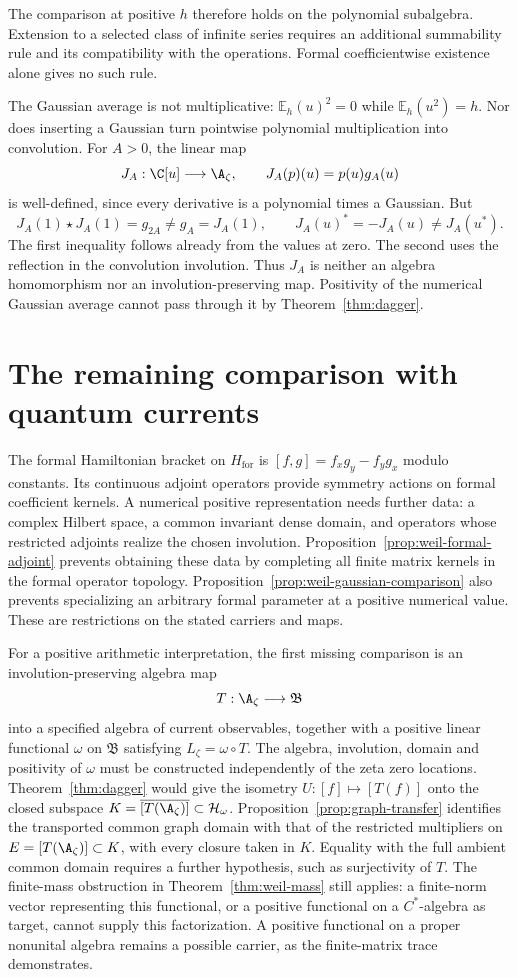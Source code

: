 The comparison at positive $h$ therefore holds on the polynomial
subalgebra.  Extension to a selected class of infinite series requires
an additional summability rule and its compatibility with the operations.
Formal coefficientwise existence alone gives no such rule.

The Gaussian average is not multiplicative:
$\mathbb E_h(u)^2=0$ while $\mathbb E_h(u^2)=h$.
Nor does inserting a Gaussian turn pointwise polynomial multiplication
into convolution.  For $A>0$, the linear map
\[
 J_A:\C[u]\longrightarrow\A_\zeta,\qquad J_A(p)(u)=p(u)g_A(u)
\]
is well-defined, since every derivative is a polynomial times a Gaussian.
But
\[
 J_A(1)\star J_A(1)=g_{2A}\ne g_A=J_A(1),
 \qquad J_A(u)^*=-J_A(u)\ne J_A(u^*).
\]
The first inequality follows already from the values at zero.
The second uses the reflection in the convolution involution.
Thus $J_A$ is neither an algebra homomorphism nor an involution-preserving
map.  Positivity of the numerical Gaussian average cannot pass through
it by Theorem~\ref{thm:dagger}.

\section{The remaining comparison with quantum currents}
\label{sec:weil-current-comparison}

The formal Hamiltonian bracket on $H_{\mathrm{for}}$ is
$[f,g]=f_xg_y-f_yg_x$ modulo constants.
Its continuous adjoint operators provide symmetry actions on formal
coefficient kernels.  A numerical positive representation needs further
data: a complex Hilbert space, a common invariant dense domain, and
operators whose restricted adjoints realize the chosen involution.
Proposition~\ref{prop:weil-formal-adjoint} prevents obtaining these data
by completing all finite matrix kernels in the formal operator topology.
Proposition~\ref{prop:weil-gaussian-comparison} also prevents specializing
an arbitrary formal parameter at a positive numerical value.
These are restrictions on the stated carriers and maps.

For a positive arithmetic interpretation, the first missing comparison
is an involution-preserving algebra map
\[
 T:\A_\zeta\longrightarrow\mathfrak B
\]
into a specified algebra of current observables, together with a positive
linear functional $\omega$ on $\mathfrak B$ satisfying
$L_\zeta=\omega\circ T$.
The algebra, involution, domain and positivity of $\omega$ must be
constructed independently of the zeta zero locations.
Theorem~\ref{thm:dagger} would give the isometry
$U:[f]\mapsto[T(f)]$ onto the closed subspace
$K=\overline{[T(\A_\zeta)]}\subset\mathcal H_\omega$.
Proposition~\ref{prop:graph-transfer} identifies the transported common
graph domain with that of the restricted multipliers on
$E=[T(\A_\zeta)]\subset K$, with every closure taken in $K$.
Equality with the full ambient common domain requires a further
hypothesis, such as surjectivity of $T$.
The finite-mass obstruction in Theorem~\ref{thm:weil-mass} still applies:
a finite-norm vector representing this functional, or a positive
functional on a $C^*$-algebra as target, cannot supply this factorization.
A positive functional on a proper nonunital algebra remains a possible
carrier, as the finite-matrix trace demonstrates.

